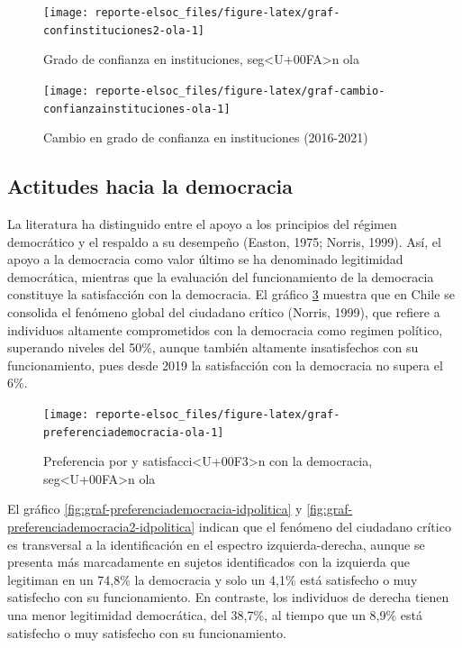 \documentclass[
  12pt,
]{book}
\begin{document}
\begin{figure}

{\centering \texttt{[image: reporte-elsoc\_files/figure-latex/graf-confinstituciones2-ola-1]} 

}

\caption{Grado de confianza en instituciones, seg<U+00FA>n ola}\label{fig:graf-confinstituciones2-ola}
\end{figure}

\begin{figure}

{\centering \texttt{[image: reporte-elsoc\_files/figure-latex/graf-cambio-confianzainstituciones-ola-1]} 

}

\caption{Cambio en grado de confianza en instituciones (2016-2021)}\label{fig:graf-cambio-confianzainstituciones-ola}
\end{figure}

\hypertarget{actitudes-hacia-la-democracia}{%
\subsection{Actitudes hacia la democracia}\label{actitudes-hacia-la-democracia}}

La literatura ha distinguido entre el apoyo a los principios del régimen democrático y el respaldo a su desempeño (Easton, 1975; Norris, 1999). Así, el apoyo a la democracia como valor último se ha denominado legitimidad democrática, mientras que la evaluación del funcionamiento de la democracia constituye la satisfacción con la democracia. El gráfico \ref{fig:graf-preferenciademocracia-ola} muestra que en Chile se consolida el fenómeno global del ciudadano crítico (Norris, 1999), que refiere a individuos altamente comprometidos con la democracia como regimen político, superando niveles del 50\%, aunque también altamente insatisfechos con su funcionamiento, pues desde 2019 la satisfacción con la democracia no supera el 6\%.

\begin{figure}

{\centering \texttt{[image: reporte-elsoc\_files/figure-latex/graf-preferenciademocracia-ola-1]} 

}

\caption{Preferencia por y satisfacci<U+00F3>n con la democracia, seg<U+00FA>n ola}\label{fig:graf-preferenciademocracia-ola}
\end{figure}

El gráfico \ref{fig:graf-preferenciademocracia-idpolitica} y \ref{fig:graf-preferenciademocracia2-idpolitica} indican que el fenómeno del ciudadano crítico es transversal a la identificación en el espectro izquierda-derecha, aunque se presenta más marcadamente en sujetos identificados con la izquierda que legitiman en un 74,8\% la democracia y solo un 4,1\% está satisfecho o muy satisfecho con su funcionamiento. En contraste, los individuos de derecha tienen una menor legitimidad democrática, del 38,7\%, al tiempo que un 8,9\% está satisfecho o muy satisfecho con su funcionamiento.
\end{document}
